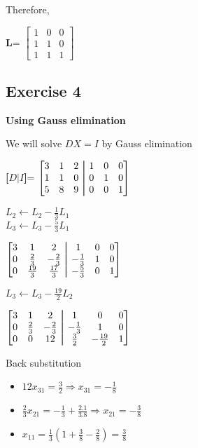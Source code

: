 \documentclass[12pt]{article}
\newcommand\aug{\fboxsep=-\fboxrule\!\!\!\fbox{\strut}\!\!\!}
\begin{document}
Therefore,
\begin{center}
\textbf{L}=
$\begin{bmatrix}
1&0&0\\
1&1&0\\
1&1&1
\end{bmatrix}
$
\end{center}

\subsection{Exercise 4}
\textbf{Using Gauss elimination}

\noindent We will solve $DX=I$ by Gauss elimination \\

\begin{center}
\textbf{[$D \vert I$]}=
$\begin{bmatrix}
3&1&2 &\aug&1&0&0\\
1&1&0 &\aug& 0&1&0\\
5&8&9 &\aug& 0&0&1
\end{bmatrix}
$ \\
\end{center}

\noindent $L_2 \leftarrow L_2 - \frac{1}{3}L_1$\\
$L_3 \leftarrow L_3 - \frac{5}{3}L_1$\\

\begin{center}
$\begin{bmatrix}
3&1&2 &\aug&1&0&0\\
0&\frac{2}{3}&-\frac{2}{3} &\aug&-\frac{1}{3}&1&0\\
0&\frac{19}{3}&\frac{17}{3} &\aug& -\frac{5}{3}&0&1
\end{bmatrix}
$ \\
\end{center}

$L_3 \leftarrow L_3 - \frac{19}{2}L_2$\\

\begin{center}
$\begin{bmatrix}
3&1&2 &\aug&1&0&0\\
0&\frac{2}{3}&-\frac{2}{3} &\aug&-\frac{1}{3}&1&0\\
0&0&12 &\aug& \frac{3}{2}&-\frac{19}{2}&1
\end{bmatrix}
$ \\
\end{center}

Back substitution
\begin{itemize}
\item $12x_{31} = \frac{3}{2} \Rightarrow x_{31} = -\frac{1}{8}$
\item $\frac{2}{3}x_{21} = -\frac{1}{3} + \frac{2.1}{3.8} \Rightarrow x_{21} = -\frac{3}{8}$
\item $x_{11} = \frac{1}{3}(1+\frac{3}{8}-\frac{2}{8}) = \frac{3}{8}$
\end{itemize}
\end{document}
